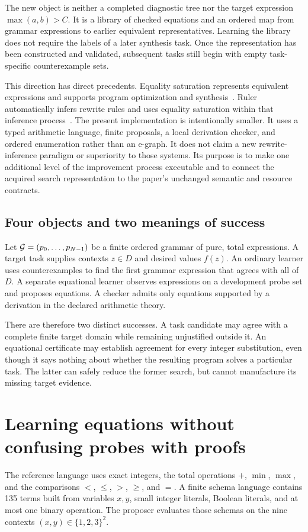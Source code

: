 The new object is neither a completed diagnostic tree nor the target expression $\max(a,b)>C$. It is a library of checked equations and an ordered map from grammar expressions to earlier equivalent representatives. Learning the library does not require the labels of a later synthesis task. Once the representation has been constructed and validated, subsequent tasks still begin with empty task-specific counterexample sets.

This direction has direct precedents. Equality saturation represents equivalent expressions and supports program optimization and synthesis~\cite{SII:egg}. Ruler automatically infers rewrite rules and uses equality saturation within that inference process~\cite{SII:ruler}. The present implementation is intentionally smaller. It uses a typed arithmetic language, finite proposals, a local derivation checker, and ordered enumeration rather than an e-graph. It does not claim a new rewrite-inference paradigm or superiority to those systems. Its purpose is to make one additional level of the improvement process executable and to connect the acquired search representation to the paper's unchanged semantic and resource contracts.

\subsection{Four objects and two meanings of success}
Let $\mathcal G=(p_0,\ldots,p_{N-1})$ be a finite ordered grammar of pure, total expressions. A target task supplies contexts $z\in D$ and desired values $f(z)$. An ordinary learner uses counterexamples to find the first grammar expression that agrees with all of $D$. A separate equational learner observes expressions on a development probe set and proposes equations. A checker admits only equations supported by a derivation in the declared arithmetic theory.

There are therefore two distinct successes. A task candidate may agree with a complete finite target domain while remaining unjustified outside it. An equational certificate may establish agreement for every integer substitution, even though it says nothing about whether the resulting program solves a particular task. The latter can safely reduce the former search, but cannot manufacture its missing target evidence.

\section{Learning equations without confusing probes with proofs}\label{SII:sec:equation-learning}
The reference language uses exact integers, the total operations $+$, $\min$, $\max$, and the comparisons $<$, $\le$, $>$, $\ge$, and $=$. A finite schema language contains 135 terms built from variables $x,y$, small integer literals, Boolean literals, and at most one binary operation. The proposer evaluates those schemas on the nine contexts $(x,y)\in\{1,2,3\}^2$.

